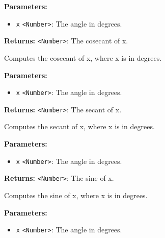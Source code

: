 \documentclass[12pt,a4paper]{article}
\begin{document}
\vspace{5mm}
\noindent {}


\noindent \textbf{Parameters:}
\begin{itemize}
  \item \texttt{x} \texttt{<Number>}: The angle in degrees.
\end{itemize}

\noindent \textbf{Returns:} \texttt{<Number>}: The cosecant of x.

\noindent Computes the cosecant of x, where x is in degrees.

\vspace{5mm}
\noindent {}


\noindent \textbf{Parameters:}
\begin{itemize}
  \item \texttt{x} \texttt{<Number>}: The angle in degrees.
\end{itemize}

\noindent \textbf{Returns:} \texttt{<Number>}: The secant of x.

\noindent Computes the secant of x, where x is in degrees.

\vspace{5mm}
\noindent {}


\noindent \textbf{Parameters:}
\begin{itemize}
  \item \texttt{x} \texttt{<Number>}: The angle in degrees.
\end{itemize}

\noindent \textbf{Returns:} \texttt{<Number>}: The sine of x.

\noindent Computes the sine of x, where x is in degrees.

\vspace{5mm}
\noindent {}


\noindent \textbf{Parameters:}
\begin{itemize}
  \item \texttt{x} \texttt{<Number>}: The angle in degrees.
\end{itemize}
\end{document}
